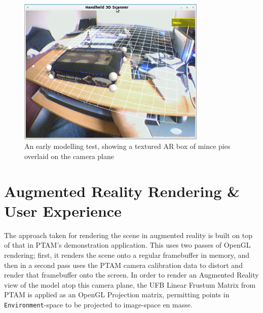 \documentclass[a4paper,10pt]{report}
\begin{document}
\begin{figure}
  \begin{center}
    \includegraphics[width=340px]{MincePies}
  \end{center}
  \caption{An early modelling test, showing a textured AR box of mince pies overlaid on the camera plane}
  \label{pies}
\end{figure}

\section{Augmented Reality Rendering \& User Experience}

The approach taken for rendering the scene in augmented reality is built on top of that in PTAM's demonstration application. This uses two passes of OpenGL rendering; first, it renders the scene onto a regular framebuffer in memory, and then in a second pass uses the PTAM camera calibration data to distort and render that framebuffer onto the screen. In order to render an Augmented Reality view of the model atop this camera plane, the UFB Linear Frustum Matrix from PTAM is applied as an OpenGL Projection matrix, permitting points in \texttt{Environment}-space to be projected to image-space en masse.
\end{document}
